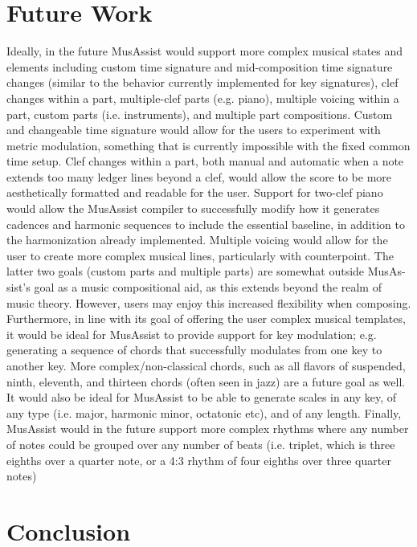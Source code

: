 \documentclass{article}
\begin{document}
\section{Future Work}
Ideally, in the future MusAssist would support more complex musical states and elements including
custom time signature and mid-composition time signature changes (similar to the behavior
currently implemented for key signatures), clef changes within a part, multiple-clef parts (e.g.
piano), multiple voicing within a part, custom parts (i.e. instruments), and multiple part compositions.
Custom and changeable time signature would allow for the users to experiment with metric modulation,
something that is currently impossible with the fixed common time setup. Clef changes within a
part, both manual and automatic when a note extends too many ledger lines beyond a clef, would
allow the score to be more aesthetically formatted and readable for the user. Support for two-clef piano
would allow the MusAssist compiler to successfully modify how it generates cadences and harmonic
sequences to include the essential baseline, in addition to the harmonization already implemented.
Multiple voicing would allow for the user to create more complex musical lines, particularly with
counterpoint. The latter two goals (custom parts and multiple parts) are somewhat outside MusAs-
sist’s goal as a music compositional aid, as this extends beyond the realm of music theory. However,
users may enjoy this increased flexibility when composing. Furthermore, in line with its goal of
offering the user complex musical templates, it would be ideal for MusAssist to provide support for
key modulation; e.g. generating a sequence of chords that successfully modulates from one key to
another key. More complex/non-classical chords, such as all flavors of suspended, ninth, eleventh,
and thirteen chords (often seen in jazz) are a future goal as well. It would also be ideal for MusAssist
to be able to generate scales in any key, of any type (i.e. major, harmonic minor, octatonic etc),
and of any length. Finally, MusAssist would in the future support more complex rhythms where
any number of notes could be grouped over any number of beats (i.e. triplet, which is three eighths
over a quarter note, or a 4:3 rhythm of four eighths over three quarter notes)

\section{Conclusion}


\end{document}
